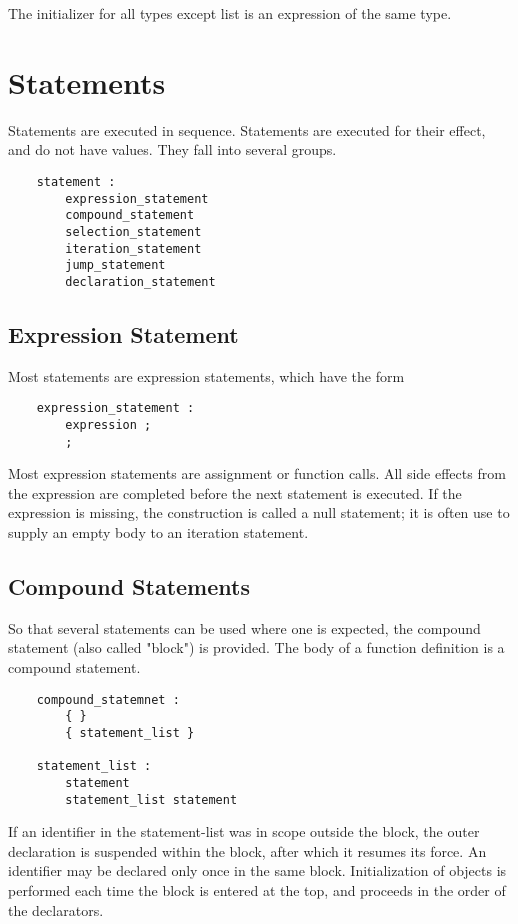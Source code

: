 \documentclass[letterpaper,12pt]{article}
\begin{document}
The initializer for all types except list is an expression of the same type. 



\section{Statements}
Statements are executed in sequence. Statements are executed for their effect, and do not have values. They fall into several groups.
\begin{lstlisting}
	statement :
		expression_statement
		compound_statement
		selection_statement
		iteration_statement
		jump_statement
		declaration_statement
\end{lstlisting}

\subsection{Expression Statement}
Most statements are expression statements, which have the form
\begin{lstlisting}
	expression_statement :
		expression ;
		;
\end{lstlisting}
Most expression statements are assignment or function calls. All side effects from the expression are completed before the next statement is executed. If the expression is missing, the construction is called a null statement; it is often use to supply an empty body to an iteration statement.

\subsection{Compound Statements}
So that several statements can be used where one is expected, the compound statement (also called "block") is provided. The body of a function definition is a compound statement.
\begin{lstlisting}
	compound_statemnet :
		{ }
		{ statement_list }

	statement_list :
		statement
		statement_list statement
\end{lstlisting}
If an identifier in the statement-list was in scope outside the block, the outer declaration is suspended within the block, after which it resumes its force. An identifier may be declared only once in the same block. Initialization of objects is performed each time the block is entered at the top, and proceeds in the order of the declarators.
\end{document}

